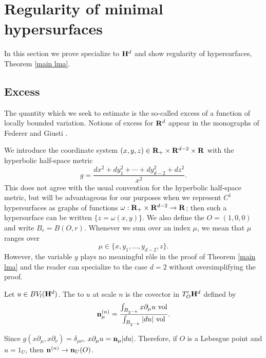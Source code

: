 \section{Regularity of minimal hypersurfaces}\label{DeGiorgiSection}
In this section we prove specialize to $\mathbf H^d$ and show regularity of hypersurfaces, Theorem \ref{main lma}.

\subsection{Excess}
The quantity which we seek to estimate is the so-called excess of a function of locally bounded variation.
Notions of excess for $\mathbf{R}^d$ appear in the monographs of Federer \cite[\S5.3.1]{federer2014geometric} and Giusti \cite[Chapter 6]{Giusti77}.

We introduce the coordinate system $(x, y, z) \in \mathbf{R}_+ \times \mathbf{R}^{d - 2} \times \mathbf{R}$ with the hyperbolic half-space metric
\begin{equation}\label{hyperbolic metric}
g = \frac{dx^2 + dy_1^2 + \cdots + dy_{d - 2}^2 + dz^2}{x^2}.
\end{equation}
This does not agree with the usual convention for the hyperbolic half-space metric, but will be advantageous for our purposes when we represent $C^1$ hypersurfaces as graphs of functions $\omega: \mathbf{R}_+ \times \mathbf{R}^{d - 2} \to \mathbf{R}$; then such a hypersurface can be written $\{z = \omega(x, y)\}$.
We also define the  $O = (1, 0, 0)$ and write $B_r = B(O, r)$.
Whenever we sum over an index $\mu$, we mean that $\mu$ ranges over
$$\mu \in \{x, y_1, \dots, y_{d - 2}, z\}.$$
However, the variable $y$ plays no meaningful r\^ole in the proof of Theorem \ref{main lma} and the reader can specialize to the case $d = 2$ without oversimplifying the proof.

\begin{definition}
Let $u \in BV_l(\mathbf H^d)$. The  to $u$ at scale $n$ is the covector in $T_O' \mathbf H^d$ defined by
$$\mathbf n^{(n)}_\mu = \frac{\int_{B_{2^{-n}}} x \partial_\mu u ~\mathrm{vol}}{\int_{B_{2^{-n}}} |du| ~\mathrm{vol}}.$$
\end{definition}

Since $g(x\partial_\mu, x\partial_\nu) = \delta_{\mu\nu}$, $x\partial_\mu u = \mathbf n_\mu|du|$.
Therefore, if $O$ is a Lebesgue point and $u = 1_U$, then $\mathbf n^{(n)} \to \mathbf n_U(O)$.

